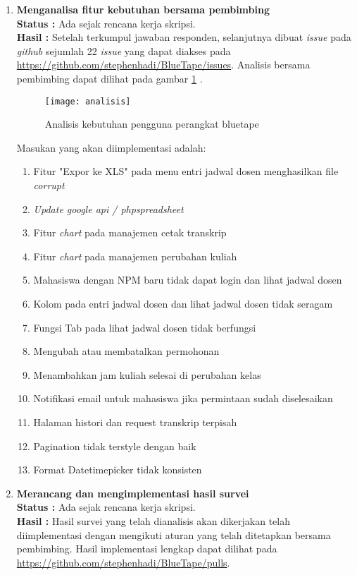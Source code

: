 \documentclass[a4paper,twoside]{article}
\begin{document}
\begin{enumerate}
	\item \textbf{Menganalisa fitur kebutuhan bersama pembimbing }\\
	{\bf Status :} Ada sejak rencana kerja skripsi.\\
	{\bf Hasil :} Setelah terkumpul jawaban responden, selanjutnya dibuat \textit{issue} pada \textit{github} sejumlah 22 \textit{issue} yang dapat diakses pada \url{https://github.com/stephenhadi/BlueTape/issues}. Analisis bersama pembimbing dapat dilihat pada gambar \ref{fig:analisis} .
	
	\begin{figure}[H]
		\centering
		\texttt{[image: analisis]} 
		\caption{Analisis kebutuhan pengguna perangkat bluetape}
		\label{fig:analisis} 
	\end{figure}
	
	Masukan yang akan diimplementasi adalah:
	\begin{enumerate}
		\item Fitur "Expor ke XLS" pada menu  entri jadwal dosen  menghasilkan file \textit{corrupt}		
		\item \textit{Update google api / phpspreadsheet}		
		\item  Fitur \textit{chart} pada manajemen cetak transkrip		
		\item Fitur \textit{chart} pada manajemen perubahan kuliah		
		\item Mahasiswa dengan NPM baru tidak dapat login dan lihat jadwal dosen		
		\item Kolom pada entri jadwal dosen dan lihat jadwal dosen tidak seragam
		\item Fungsi Tab pada lihat jadwal dosen tidak berfungsi
		\item Mengubah atau membatalkan permohonan
		\item Menambahkan jam kuliah selesai di perubahan kelas
		\item Notifikasi email untuk mahasiswa jika permintaan sudah diselesaikan
		\item Halaman histori dan request transkrip terpisah
		\item Pagination tidak terstyle dengan baik
		\item Format Datetimepicker tidak konsisten
	\end{enumerate}

	\item \textbf{Merancang dan mengimplementasi hasil survei}\\
	{\bf Status :} Ada sejak rencana kerja skripsi.\\
	{\bf Hasil :} Hasil survei yang telah dianalisis akan dikerjakan telah diimplementasi dengan mengikuti aturan yang telah ditetapkan bersama pembimbing. Hasil implementasi lengkap dapat dilihat pada \url{https://github.com/stephenhadi/BlueTape/pulls}.	
	

\end{enumerate}
\end{document}
